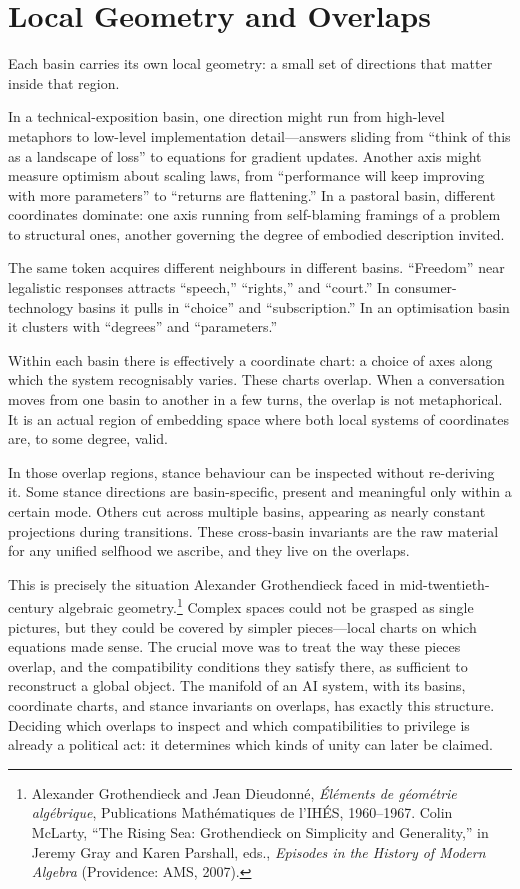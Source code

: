 \documentclass[12pt,a4paper]{article}
\begin{document}
\section{Local Geometry and Overlaps}

Each basin carries its own local geometry: a small set of directions that matter inside that region.

In a technical-exposition basin, one direction might run from high-level metaphors to low-level implementation detail---answers sliding from ``think of this as a landscape of loss'' to equations for gradient updates. Another axis might measure optimism about scaling laws, from ``performance will keep improving with more parameters'' to ``returns are flattening.'' In a pastoral basin, different coordinates dominate: one axis running from self-blaming framings of a problem to structural ones, another governing the degree of embodied description invited.

The same token acquires different neighbours in different basins. ``Freedom'' near legalistic responses attracts ``speech,'' ``rights,'' and ``court.'' In consumer-technology basins it pulls in ``choice'' and ``subscription.'' In an optimisation basin it clusters with ``degrees'' and ``parameters.''

Within each basin there is effectively a coordinate chart: a choice of axes along which the system recognisably varies. These charts overlap. When a conversation moves from one basin to another in a few turns, the overlap is not metaphorical. It is an actual region of embedding space where both local systems of coordinates are, to some degree, valid.

In those overlap regions, stance behaviour can be inspected without re-deriving it. Some stance directions are basin-specific, present and meaningful only within a certain mode. Others cut across multiple basins, appearing as nearly constant projections during transitions. These cross-basin invariants are the raw material for any unified selfhood we ascribe, and they live on the overlaps.

This is precisely the situation Alexander Grothendieck faced in mid-twentieth-century algebraic geometry.\footnote{Alexander Grothendieck and Jean Dieudonné, \emph{Éléments de géométrie algébrique}, Publications Mathématiques de l'IHÉS, 1960--1967. Colin McLarty, ``The Rising Sea: Grothendieck on Simplicity and Generality,'' in Jeremy Gray and Karen Parshall, eds., \emph{Episodes in the History of Modern Algebra} (Providence: AMS, 2007).} Complex spaces could not be grasped as single pictures, but they could be covered by simpler pieces---local charts on which equations made sense. The crucial move was to treat the way these pieces overlap, and the compatibility conditions they satisfy there, as sufficient to reconstruct a global object. The manifold of an AI system, with its basins, coordinate charts, and stance invariants on overlaps, has exactly this structure. Deciding which overlaps to inspect and which compatibilities to privilege is already a political act: it determines which kinds of unity can later be claimed.
\end{document}
